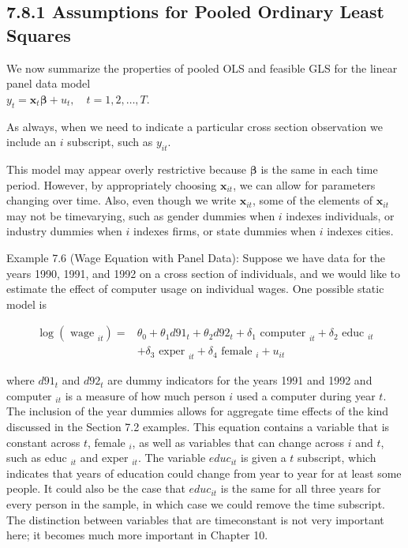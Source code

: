 \documentclass[10pt]{article}
\begin{document}
\subsection*{7.8.1 Assumptions for Pooled Ordinary Least Squares}
We now summarize the properties of pooled OLS and feasible GLS for the linear panel data model\\
$y_{t}=\mathbf{x}_{t} \boldsymbol{\beta}+u_{t}, \quad t=1,2, \ldots, T$.

As always, when we need to indicate a particular cross section observation we include an $i$ subscript, such as $y_{i t}$.

This model may appear overly restrictive because $\boldsymbol{\beta}$ is the same in each time period. However, by appropriately choosing $\mathbf{x}_{i t}$, we can allow for parameters changing over time. Also, even though we write $\mathbf{x}_{i t}$, some of the elements of $\mathbf{x}_{i t}$ may not be timevarying, such as gender dummies when $i$ indexes individuals, or industry dummies when $i$ indexes firms, or state dummies when $i$ indexes cities.

Example 7.6 (Wage Equation with Panel Data): Suppose we have data for the years 1990, 1991, and 1992 on a cross section of individuals, and we would like to estimate the effect of computer usage on individual wages. One possible static model is


\begin{align*}
\log \left(\text { wage }_{i t}\right)= & \theta_{0}+\theta_{1} d 91_{t}+\theta_{2} d 92_{t}+\delta_{1} \text { computer }_{i t}+\delta_{2} \text { educ }_{i t} \\
& +\delta_{3} \text { exper }_{i t}+\delta_{4} \text { female }_{i}+u_{i t} \tag{7.71}
\end{align*}


where $d 91_{t}$ and $d 92_{t}$ are dummy indicators for the years 1991 and 1992 and computer $_{i t}$ is a measure of how much person $i$ used a computer during year $t$. The inclusion of the year dummies allows for aggregate time effects of the kind discussed in the Section 7.2 examples. This equation contains a variable that is constant across $t$, female $_{i}$, as well as variables that can change across $i$ and $t$, such as educ ${ }_{i t}$ and exper ${ }_{i t}$. The variable $e d u c_{i t}$ is given a $t$ subscript, which indicates that years of education could change from year to year for at least some people. It could also be the case that $e d u c_{i t}$ is the same for all three years for every person in the sample, in which case we could remove the time subscript. The distinction between variables that are timeconstant is not very important here; it becomes much more important in Chapter 10.
\end{document}
